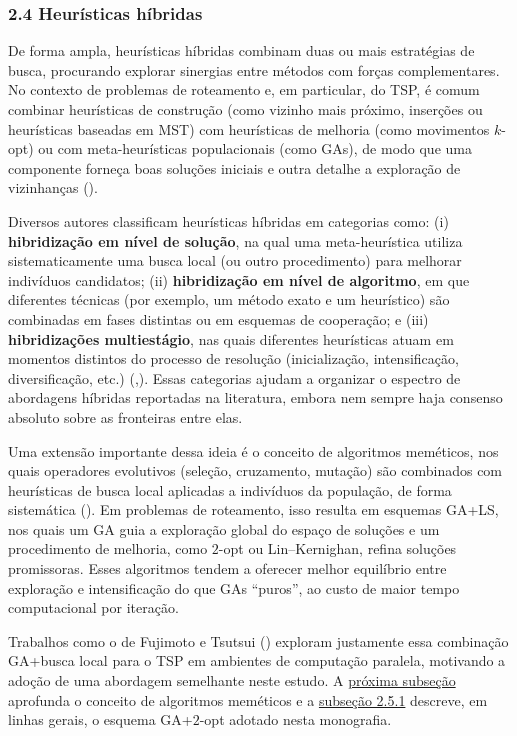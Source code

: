 \subsubsection{2.4 Heurísticas
híbridas}\label{sec-24-heuristicas-hibridas}

De forma ampla, heurísticas híbridas combinam duas ou mais estratégias
de busca, procurando explorar sinergias entre métodos com forças
complementares. No contexto de problemas de roteamento e, em particular,
do TSP, é comum combinar heurísticas de construção (como vizinho mais
próximo, inserções ou heurísticas baseadas em MST) com heurísticas de
melhoria (como movimentos \(k\)-opt) ou com meta-heurísticas
populacionais (como GAs), de modo que uma componente forneça boas
soluções iniciais e outra detalhe a exploração de vizinhanças
().

Diversos autores classificam heurísticas híbridas em categorias como:
(i) \textbf{hibridização em nível de solução}, na qual uma
meta-heurística utiliza sistematicamente uma busca local (ou outro
procedimento) para melhorar indivíduos candidatos; (ii)
\textbf{hibridização em nível de algoritmo}, em que diferentes técnicas
(por exemplo, um método exato e um heurístico) são combinadas em fases
distintas ou em esquemas de cooperação; e (iii) \textbf{hibridizações
multiestágio}, nas quais diferentes heurísticas atuam em momentos
distintos do processo de resolução (inicialização, intensificação,
diversificação, etc.)
(,).
Essas categorias ajudam a organizar o espectro de abordagens híbridas
reportadas na literatura, embora nem sempre haja consenso absoluto sobre
as fronteiras entre elas.

Uma extensão importante dessa ideia é o conceito de algoritmos
meméticos, nos quais operadores evolutivos (seleção, cruzamento,
mutação) são combinados com heurísticas de busca local aplicadas a
indivíduos da população, de forma sistemática
(). Em problemas de roteamento,
isso resulta em esquemas GA+LS, nos quais um GA guia a exploração global
do espaço de soluções e um procedimento de melhoria, como \(2\)-opt ou
Lin--Kernighan, refina soluções promissoras. Esses algoritmos tendem a
oferecer melhor equilíbrio entre exploração e intensificação do que GAs
``puros'', ao custo de maior tempo computacional por iteração.

Trabalhos como o de Fujimoto e Tsutsui
() exploram justamente essa
combinação GA+busca local para o TSP em ambientes de computação
paralela, motivando a adoção de uma abordagem semelhante neste estudo. A
\hyperref[sec-25-algoritmos-memeticos]{próxima subseção} aprofunda o
conceito de algoritmos meméticos e a \hyperref[sec-251-ga-2opt]{subseção
2.5.1} descreve, em linhas gerais, o esquema GA+\(2\)-opt adotado nesta
monografia.

